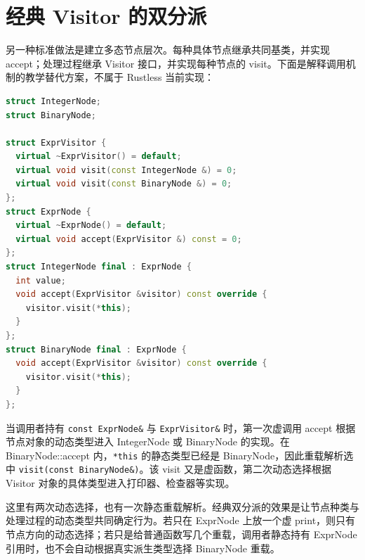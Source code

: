 \section{经典 Visitor 的双分派}
另一种标准做法是建立多态节点层次。每种具体节点继承共同基类，并实现 accept；处理过程继承 Visitor 接口，并实现每种节点的 visit。下面是解释调用机制的教学替代方案，不属于 Rustless 当前实现：
\begin{lstlisting}[language=C++]
struct IntegerNode;
struct BinaryNode;

struct ExprVisitor {
  virtual ~ExprVisitor() = default;
  virtual void visit(const IntegerNode &) = 0;
  virtual void visit(const BinaryNode &) = 0;
};
struct ExprNode {
  virtual ~ExprNode() = default;
  virtual void accept(ExprVisitor &) const = 0;
};
struct IntegerNode final : ExprNode {
  int value;
  void accept(ExprVisitor &visitor) const override {
    visitor.visit(*this);
  }
};
struct BinaryNode final : ExprNode {
  void accept(ExprVisitor &visitor) const override {
    visitor.visit(*this);
  }
};
\end{lstlisting}
当调用者持有 \texttt{const ExprNode\&} 与 \texttt{ExprVisitor\&} 时，第一次虚调用 accept 根据节点对象的动态类型进入 IntegerNode 或 BinaryNode 的实现。在 BinaryNode::accept 内，\texttt{*this} 的静态类型已经是 BinaryNode，因此重载解析选中 \texttt{visit(const BinaryNode\&)}。该 visit 又是虚函数，第二次动态选择根据 Visitor 对象的具体类型进入打印器、检查器等实现。

这里有两次动态选择，也有一次静态重载解析。经典双分派的效果是让节点种类与处理过程的动态类型共同确定行为。若只在 ExprNode 上放一个虚 print，则只有节点方向的动态选择；若只是给普通函数写几个重载，调用者静态持有 ExprNode 引用时，也不会自动根据真实派生类型选择 BinaryNode 重载。

